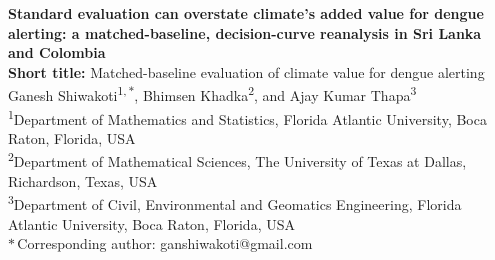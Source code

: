\documentclass[11pt,a4paper]{article}
\begin{document}
\linenumbers

\thispagestyle{fancy}
\begin{center}
{\Large \textbf{Standard evaluation can overstate climate's added value for dengue alerting: a matched-baseline, decision-curve reanalysis in Sri Lanka and Colombia}}\\[1.0em]

{\normalsize \textbf{Short title:} Matched-baseline evaluation of climate value for dengue alerting}\\[1.2em]

Ganesh Shiwakoti\textsuperscript{1,\,$\ast$}, Bhimsen Khadka\textsuperscript{2}, and Ajay Kumar Thapa\textsuperscript{3}\\[0.6em]

\footnotesize
\textsuperscript{1}Department of Mathematics and Statistics, Florida Atlantic University, Boca Raton, Florida, USA\\
\textsuperscript{2}Department of Mathematical Sciences, The University of Texas at Dallas, Richardson, Texas, USA\\
\textsuperscript{3}Department of Civil, Environmental and Geomatics Engineering, Florida Atlantic University, Boca Raton, Florida, USA\\[0.3em]
$\ast$\,Corresponding author: ganshiwakoti@gmail.com
\end{center}


\newpage
\end{document}
